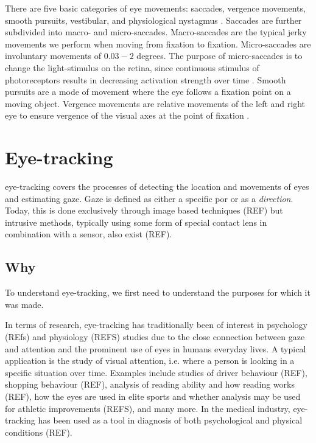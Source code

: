 There are five basic categories of eye movements: saccades, vergence movements, smooth pursuits, vestibular, and physiological nystagmus \parencite[39]{methodology}. Saccades are further subdivided into macro- and micro-saccades. Macro-saccades are the typical jerky movements we perform when moving from fixation to fixation. Micro-saccades are involuntary movements of $0.03-2$ degrees. The purpose of micro-saccades is to change the light-stimulus on the retina, since continuous stimulus of photoreceptors results in decreasing activation strength over time \parencite[44]{methodology}. Smooth pursuits are a mode of movement where the eye follows a fixation point on a moving object. Vergence movements are relative movements of the left and right eye to ensure vergence of the visual axes at the point of fixation \parencite{methodology}.


\section{Eye-tracking}
\Gls{eye-tracking} covers the processes of detecting the location and movements of eyes and estimating \gls{gaze}. Gaze is defined as either a specific \acrfull{por} or as a \emph{direction}. Today, this is done exclusively through image based techniques (REF) but intrusive methods, typically using some form of special contact lens in combination with a sensor, also exist (REF).

\subsection{Why}
To understand \gls{eye-tracking}, we first need to understand the purposes for which it was made. 

In terms of research, \gls{eye-tracking} has traditionally been of interest in psychology (REfs) and physiology (REFS) studies due to the close connection between gaze and attention and the prominent use of eyes in humans everyday lives. A typical application is the study of visual attention, i.e. where a person is looking in a specific situation over time. Examples include studies of driver behaviour (REF), shopping behaviour (REF), analysis of reading ability and how reading works (REF), how the eyes are used in elite sports and whether analysis may be used for athletic improvements (REFS), and many more. In the medical industry, eye-tracking has been used as a tool in diagnosis of both psychological and physical conditions (REF). 

